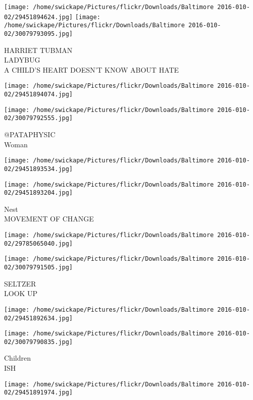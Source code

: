 \documentclass[10pt,letterpaper]{article}
\begin{document}
\vspace{0.25in}
\texttt{[image: /home/swickape/Pictures/flickr/Downloads/Baltimore 2016-010-02/29451894624.jpg]}
\texttt{[image: /home/swickape/Pictures/flickr/Downloads/Baltimore 2016-010-02/30079793095.jpg]}

HARRIET TUBMAN\\
LADYBUG\\
A CHILD'S HEART DOESN'T KNOW ABOUT HATE
\pagebreak

\texttt{[image: /home/swickape/Pictures/flickr/Downloads/Baltimore 2016-010-02/29451894074.jpg]}

\vspace{0.25in}
\texttt{[image: /home/swickape/Pictures/flickr/Downloads/Baltimore 2016-010-02/30079792555.jpg]}

@PATAPHYSIC\\
Woman
\pagebreak

\texttt{[image: /home/swickape/Pictures/flickr/Downloads/Baltimore 2016-010-02/29451893534.jpg]}

\vspace{0.25in}
\texttt{[image: /home/swickape/Pictures/flickr/Downloads/Baltimore 2016-010-02/29451893204.jpg]}

Nest\\
MOVEMENT OF CHANGE
\pagebreak

\texttt{[image: /home/swickape/Pictures/flickr/Downloads/Baltimore 2016-010-02/29785065040.jpg]}

\vspace{0.25in}
\texttt{[image: /home/swickape/Pictures/flickr/Downloads/Baltimore 2016-010-02/30079791505.jpg]}

SELTZER\\
LOOK UP
\pagebreak

\texttt{[image: /home/swickape/Pictures/flickr/Downloads/Baltimore 2016-010-02/29451892634.jpg]}

\vspace{0.25in}
\texttt{[image: /home/swickape/Pictures/flickr/Downloads/Baltimore 2016-010-02/30079790835.jpg]}

Children\\
ISH
\pagebreak

\texttt{[image: /home/swickape/Pictures/flickr/Downloads/Baltimore 2016-010-02/29451891974.jpg]}
\end{document}
